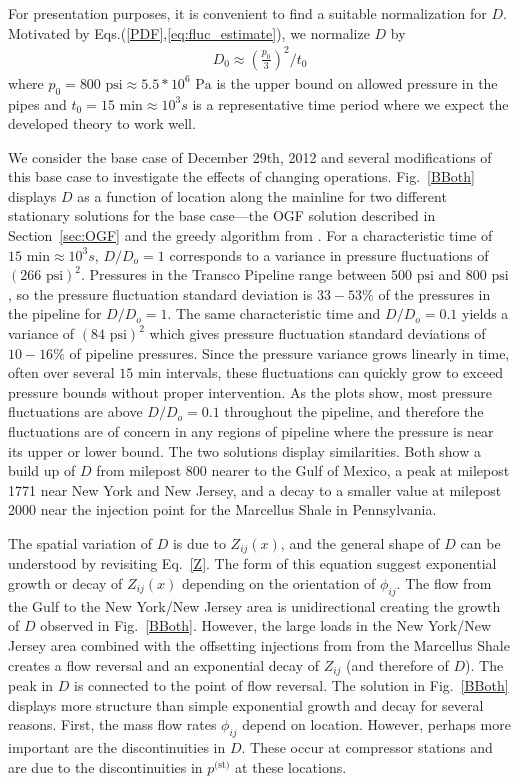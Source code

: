 \documentclass[10pt, conference, compsocconf]{IEEEtran}
\begin{document}
For presentation purposes, it is convenient to find a suitable normalization for $D$.  Motivated by Eqs.(\ref{PDF},\ref{eq:fluc_estimate}), we normalize $D$ by
\begin{align*}
D_0 \approx \left(\frac{p_0}{3}\right)^2/t_0
\end{align*}
where $p_0=800 \mbox{ psi}\approx 5.5*10^6 \mbox{ Pa}$ is the upper
bound on allowed pressure in the pipes and $t_0=15\mbox{ min}\approx 10^3
s$ is a representative time period where we expect the developed theory to
work well.

We consider the base case of December 29th, 2012 and several modifications of this base case to investigate the effects of changing operations.   Fig.~\ref{BBoth} displays $D$ as a function of location along the mainline for two different stationary solutions for the base case---the OGF solution described in Section~\ref{sec:OGF} and the greedy algorithm from \cite{13MFBBCP}. For a characteristic time of $15\mbox{ min} \approx 10^3s$, \; $D/D_o = 1$ corresponds to a variance in pressure fluctuations of $(266\mbox{ psi})^2$. Pressures in the Transco Pipeline range between $500\mbox{ psi}$ and $800\mbox{ psi}$, so the pressure fluctuation standard deviation is $33-53\%$ of the pressures in the pipeline for $D/D_o = 1$. The same characteristic time and $D/D_o = 0.1$ yields a variance of $(84\mbox{ psi})^2$ which gives pressure fluctuation standard deviations of $10-16\%$ of pipeline pressures. Since the pressure variance grows linearly in time, often over several $15\mbox{ min}$ intervals, these fluctuations can quickly grow to exceed pressure bounds without proper intervention. As the plots show, most pressure fluctuations are above $D/D_o = 0.1$ throughout the pipeline, and therefore the fluctuations are of concern in any regions of pipeline where the pressure is near its upper or lower bound. The two solutions display similarities. Both show a build up of $D$ from milepost 800 nearer to the Gulf of Mexico, a peak at milepost 1771 near New York and New Jersey, and a decay to a smaller value at milepost 2000 near the injection point for the Marcellus Shale in Pennsylvania.

The spatial variation of $D$ is due to $Z_{ij}(x)$, and the general shape of $D$ can be understood by revisiting Eq.~\ref{Z}.  The form of this equation suggest exponential growth or decay of $Z_{ij}(x)$ depending on the orientation of $\phi_{ij}$. The flow from the Gulf to the New York/New Jersey area is unidirectional creating the growth of $D$ observed in Fig.~\ref{BBoth}.  However, the large loads in the New York/New Jersey area combined with the offsetting injections from from the Marcellus Shale creates a flow reversal and an exponential decay of $Z_{ij}$ (and therefore of $D$).  The peak in $D$ is connected to the point of flow reversal.  The solution in Fig.~\ref{BBoth} displays more structure than simple exponential growth and decay for several reasons.  First, the mass flow rates $\phi_{ij}$ depend on location.  However, perhaps more important are the discontinuities in $D$.  These occur at compressor stations and are due to the discontinuities in $p^{\mbox{(st)}}$ at these locations.
\end{document}
